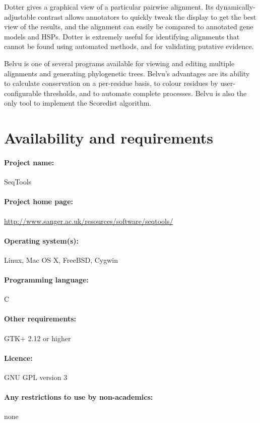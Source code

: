 \documentclass[10pt]{bmc_article}
\newenvironment{bmcformat}{\begin{raggedright}\baselineskip20pt\sloppy\setboolean{publ}{false}}{\end{raggedright}\baselineskip20pt\sloppy}
\begin{document}
\begin{bmcformat}
Dotter gives a graphical view of a particular pairwise alignment. Its dynamically-adjustable contrast allows annotators to quickly tweak the display to get the best view of the results, and the alignment can easily be compared to annotated gene models and HSPs. Dotter is extremely useful for identifying alignments that cannot be found using automated methods, and for validating putative evidence. 

Belvu is one of several programs available for viewing and editing multiple alignments and generating phylogenetic trees. Belvu's advantages are its ability to calculate conservation on a per-residue basis, to colour residues by user-configurable thresholds, and to automate complete processes. Belvu is also the only tool to implement the Scoredist algorithm\cite{So05}.


\section*{Availability and requirements}
\paragraph{Project name:} SeqTools
\paragraph{Project home page:} \url{http://www.sanger.ac.uk/resources/software/seqtools/}
\paragraph{Operating system(s):} Linux, Mac OS X, FreeBSD, Cygwin
\paragraph{Programming language:} C
\paragraph{Other requirements:} GTK+ 2.12 or higher
\paragraph{Licence:} GNU GPL version 3
\paragraph{Any restrictions to use by non-academics:} none



\end{bmcformat}
\end{document}
